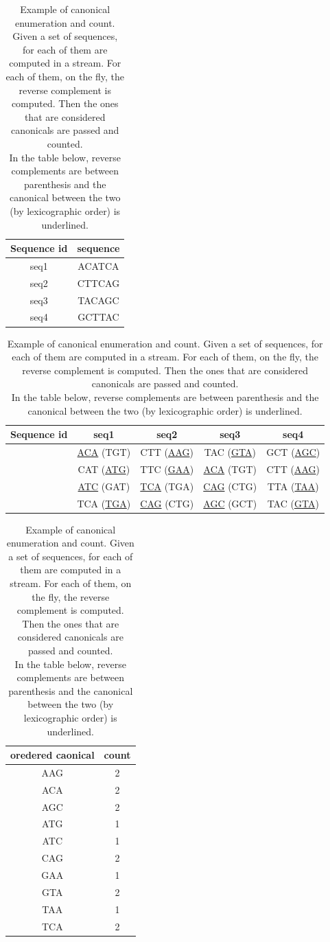 \begin{table}
\begin{center}
	\begin{tabular}{c | c}

		Sequence id & sequence \\
		\hline
		seq1 & ACATCA \\
		seq2 & CTTCAG \\
		seq3 & TACAGC \\
		seq4 & GCTTAC \\
		
	\end{tabular}
\newline
\vspace*{0.2 cm}
\newline

	\begin{tabular}{c | c | c | c  | c}

		Sequence id & seq1 & seq2 & seq3 & seq4\\
		\hline
		\kmers  & \underline{ACA} (TGT) & CTT (\underline{AAG}) & TAC (\underline{GTA}) & GCT (\underline{AGC}) \\
			    & CAT (\underline{ATG}) & TTC (\underline{GAA}) & \underline{ACA} (TGT) & CTT (\underline{AAG}) \\
				& \underline{ATC} (GAT) & \underline{TCA} (TGA) & \underline{CAG} (CTG) & TTA (\underline{TAA}) \\
				& TCA (\underline{TGA}) & \underline{CAG} (CTG) & \underline{AGC} (GCT) & TAC (\underline{GTA}) \\
	\end{tabular}
\newline
\vspace*{0.2 cm}
\newline

	\begin{tabular}{c | c}

		oredered caonical \kmer & count\\
		\hline
		AAG & 2 \\
		ACA & 2 \\
		AGC & 2 \\
		ATG & 1 \\
		ATC & 1 \\
		CAG & 2 \\
		GAA & 1 \\
		GTA & 2 \\
		TAA & 1 \\
		TCA & 2 \\
	\end{tabular}
\end{center}
	\caption[Example of canonical \kmer counting.]{Example of canonical \kmers enumeration and count. Given a set of sequences, for each of them \kmers are computed in a stream. For each of them, on the fly, the reverse complement is computed. Then the ones that are considered canonicals are passed and counted.\\ In the table below, reverse complements are between parenthesis and the canonical between the two (by lexicographic order) is underlined.}
	\label{tab-lista-kmer}
\end{table}

